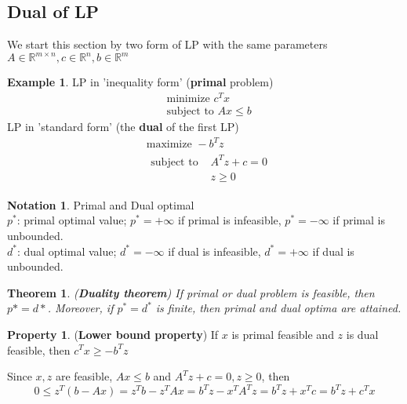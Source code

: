 \documentclass[10pt]{article}
\def\R{\mathbb{R}}
\newtheorem{thm}{Theorem}[section]
\theoremstyle{definition}
\newtheorem{example}{Example}[section]
\newtheorem{pty}{Property}[section]
\newtheorem{notation}{Notation}[section]
\begin{document}
\subsection{Dual of LP}
We start this section by two form of LP with the same parameters $A \in \R^{m\times n}, c\in \R^{n}, b\in \R^{m} $
\begin{example}
	LP in 'inequality form' (\textbf{primal} problem)
	\begin{equation*}
		\begin{split}
			&\text{minimize } c^Tx\\
			&\text{subject to } Ax \le b
		\end{split}
	\end{equation*}
	LP in 'standard form' (the \textbf{dual} of the first LP)
	\begin{equation*}
		\begin{split}
			&\text{maximize } -b^Tz\\
			&\begin{split}
				\text{subject to } &A^Tz + c = 0\\
				&z \ge 0
			\end{split}
		\end{split}
	\end{equation*}
\end{example}

\begin{notation}
	Primal and Dual optimal\\
	$p^*$: primal optimal value; $p^* = +\infty$ if primal is infeasible, $p^* = -\infty$ if primal is unbounded.\\
	$d^*$: dual optimal value; $d^* = -\infty$ if dual is infeasible, $d^* = +\infty$ if dual is unbounded.
\end{notation}


\begin{thm} (\textbf{Duality theorem})
	If primal or dual problem is feasible, then $p* = d*$. Moreover, if $p^* = d^*$ is finite, 
	then primal and dual optima are attained.
\end{thm}

\begin{pty} (\textbf{Lower bound property})
	If $x$ is primal feasible and $z$ is dual feasible, then $c^Tx \ge - b^Tz$
\end{pty}
\proof Since $x, z$ are feasible,  $Ax \le b$ and $A^Tz + c = 0, z \ge 0$, then
\begin{equation*}
	0 \le z^T(b-Ax) = z^Tb - z^TAx = b^Tz - x^TA^Tz = b^Tz + x^Tc = b^Tz + c^Tx
\end{equation*}
\qedhere
\end{document}

